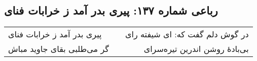 \begin{center}
\section*{رباعی شماره ۱۳۷: پیری بدر آمد ز خرابات فنای}
\label{sec:137}
\begin{longtable}{l p{0.5cm} r}
پیری بدر آمد ز خرابات فنای
&&
در گوش دلم گفت که: ای شیفته رای
\\
گر می‌طلبی بقای جاوید مباش
&&
بی‌بادهٔ روشن اندرین تیره‌سرای
\\
\end{longtable}
\end{center}
